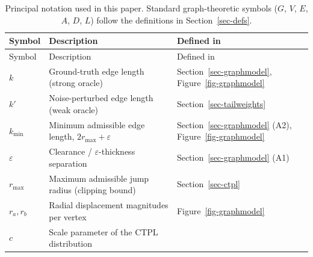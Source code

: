 \documentclass[
  11pt,
  letterpaper]{siamart251216}
\begin{document}
{\footnotesize

\begin{longtable}[]{@{}
  >{\raggedright\arraybackslash}p{}
  >{\raggedright\arraybackslash}p{}
  >{\raggedright\arraybackslash}p{}@{}}
\caption{Principal notation used in this paper. Standard graph-theoretic
symbols (\(G\), \(V\), \(E\), \(A\), \(D\), \(L\)) follow the
definitions in
Section~\ref{sec-defs}.}\label{tbl-notation}\tabularnewline
\toprule\noalign{}
\begin{minipage}[b]{\linewidth}\raggedright
Symbol
\end{minipage} & \begin{minipage}[b]{\linewidth}\raggedright
Description
\end{minipage} & \begin{minipage}[b]{\linewidth}\raggedright
Defined in
\end{minipage} \\
\midrule\noalign{}
\endfirsthead
\toprule\noalign{}
\begin{minipage}[b]{\linewidth}\raggedright
Symbol
\end{minipage} & \begin{minipage}[b]{\linewidth}\raggedright
Description
\end{minipage} & \begin{minipage}[b]{\linewidth}\raggedright
Defined in
\end{minipage} \\
\midrule\noalign{}
\endhead
\bottomrule\noalign{}
\endlastfoot
\(k\) & Ground-truth edge length (strong oracle) &
Section~\ref{sec-graphmodel}, Figure~\ref{fig-graphmodel} \\
\(k'\) & Noise-perturbed edge length (weak oracle) &
Section~\ref{sec-tailweights} \\
\(k_{\min}\) & Minimum admissible edge length, \(2r_{\max}+\varepsilon\)
& Section~\ref{sec-graphmodel} (A2), Figure~\ref{fig-graphmodel} \\
\(\varepsilon\) & Clearance / \(\varepsilon\)-thickness separation &
Section~\ref{sec-graphmodel} (A1) \\
\(r_{\max}\) & Maximum admissible jump radius (clipping bound) &
Section~\ref{sec-ctpl} \\
\(r_a, r_b\) & Radial displacement magnitudes per vertex &
Figure~\ref{fig-graphmodel} \\
\(c\) & Scale parameter of the \ac{CTPL} distribution &

\end{longtable}}
\end{document}
